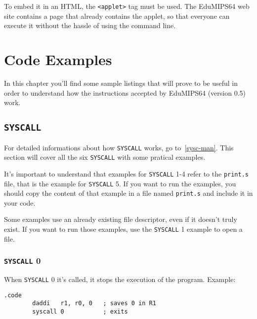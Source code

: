 \documentclass[12pt]{report}
\newcommand{\EM}{EduMIPS64}
\newcommand{\EV}{0.5}
\newcommand{\SC}{\texttt{SYSCALL}}
\begin{document}
To embed it in an HTML, the \texttt{<applet>} tag must be used. The \EM{} web
site contains a page that already contains the applet, so
that everyone can execute it without the hassle of using the command line.

\chapter{Code Examples}
In this chapter you'll find some sample listings that will prove to be useful in
order to understand how the instructions accepted by \EM{} (version \EV{}) work.

\section{\SC{}}
For detailed informations about how \SC{} works, go to~\ref{sysc-man}. This
section will cover all the six \SC{} with some pratical examples.

It's important to understand that examples for \SC{} 1-4 refer to the
\texttt{print.s} file, that is the example for \SC{} 5. If you want to run the
examples, you should copy the content of that example in a file named
\texttt{print.s} and include it in your code.

Some examples use an already existing file descriptor, even if it doesn't truly
exist. If you want to run those examples, use the \SC{} 1 example to open a
file.

\subsection{\SC{} 0}
When \SC{} 0 it's called, it stops the execution of the program.
Example:
\begin{lstlisting}[caption={\SC{} 0 example}, label={code:syscall0}, style={mips}]
        .code
        daddi   r1, r0, 0	; saves 0 in R1
        syscall 0	    	; exits
\end{lstlisting}
\end{document}
